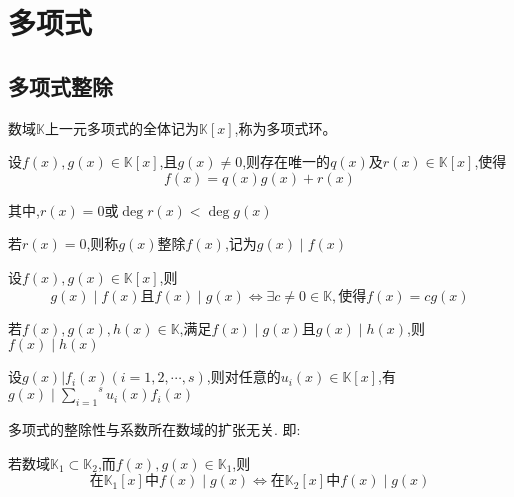 \chapter{多项式}
\section{多项式整除}

\begin{knowledge}[多项式环]
    数域$\mathbb{K}$上一元多项式的全体记为$\mathbb{K}[x]$,称为多项式环。
\end{knowledge}

\begin{knowledge}[带余除法]
    设$f(x),g(x)\in \mathbb{K}[x]$,且$g(x)\ne 0$,则存在唯一的$q(x)$及$r(x)\in \mathbb{K}[x]$,使得
    \begin{equation}
        f(x)=q(x)g(x)+r(x)
    \end{equation}

    其中,$r(x)=0$或$\deg r(x)<\deg g(x)$

    若$r(x)=0$,则称$g(x)$整除$f(x)$,记为$g(x)\mid f(x)$
\end{knowledge}

\begin{knowledge}[多项式等价]\label{多项式等价}
    设$f(x),g(x)\in \mathbb{K}[x]$,则
    \begin{equation}
        g(x)\mid f(x)\mbox{且}f(x)\mid g(x) \Longleftrightarrow \exists c\ne 0\in \mathbb{K},\mbox{使得}f(x)=cg(x)
    \end{equation}
\end{knowledge}

\begin{knowledge}[整除的传递性] \label{整除的传递性}
    若$f(x),g(x),h(x)\in \mathbb{K}$,满足$f(x)\mid g(x)$且$g(x)\mid h(x)$,则$f(x)\mid h(x)$
\end{knowledge}

\begin{knowledge}[整除线性组合]
    \label{整除线性组合}
    设$g(x)|f_{i}(x)(i=1,2,\cdots,s)$,则对任意的$u_i(x)\in \mathbb{K}[x]$,有$g(x)\mid \overset{s}{\underset{i=1}{\sum}}u_i(x)f_i(x)$
\end{knowledge}

\begin{knowledge}[数域扩张不影响整除性]
    多项式的整除性与系数所在数域的扩张无关. 即:

    若数域$\mathbb{K}_1\subset \mathbb{K}_2$,而$f(x),g(x)\in \mathbb{K}_1$,则
    \begin{equation}
        \mbox{在$\mathbb{K}_1[x]$中}f(x)\mid g(x)\Longleftrightarrow \mbox{在$\mathbb{K}_2[x]$中}f(x)\mid g(x)
    \end{equation}
\end{knowledge}

